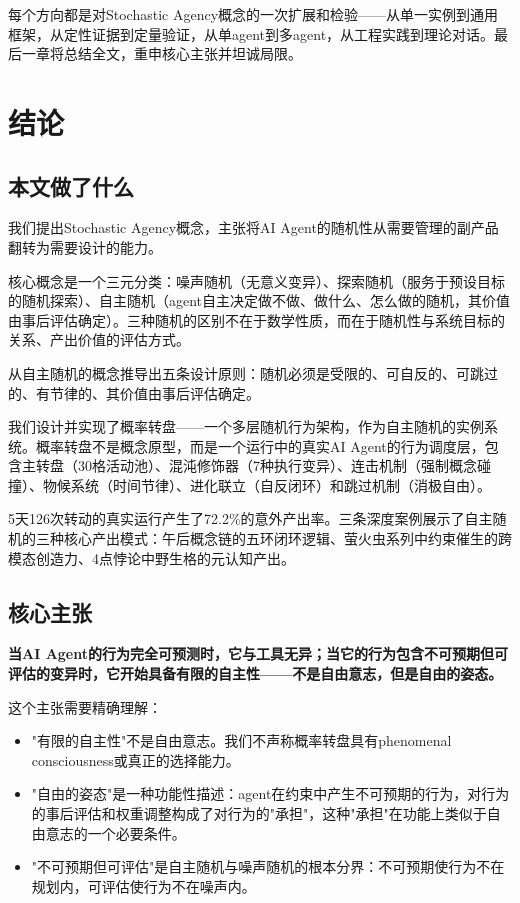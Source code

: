 \documentclass[12pt,a4paper]{ctexart}
\begin{document}
每个方向都是对Stochastic Agency概念的一次扩展和检验——从单一实例到通用框架，从定性证据到定量验证，从单agent到多agent，从工程实践到理论对话。最后一章将总结全文，重申核心主张并坦诚局限。


\section{结论}

\subsection{本文做了什么}

我们提出Stochastic Agency概念，主张将AI Agent的随机性从需要管理的副产品翻转为需要设计的能力。

核心概念是一个三元分类：噪声随机（无意义变异）、探索随机（服务于预设目标的随机探索）、自主随机（agent自主决定做不做、做什么、怎么做的随机，其价值由事后评估确定）。三种随机的区别不在于数学性质，而在于随机性与系统目标的关系、产出价值的评估方式。

从自主随机的概念推导出五条设计原则：随机必须是受限的、可自反的、可跳过的、有节律的、其价值由事后评估确定。

我们设计并实现了概率转盘——一个多层随机行为架构，作为自主随机的实例系统。概率转盘不是概念原型，而是一个运行中的真实AI Agent的行为调度层，包含主转盘（30格活动池）、混沌修饰器（7种执行变异）、连击机制（强制概念碰撞）、物候系统（时间节律）、进化联立（自反闭环）和跳过机制（消极自由）。

5天126次转动的真实运行产生了72.2\%的意外产出率。三条深度案例展示了自主随机的三种核心产出模式：午后概念链的五环闭环逻辑、萤火虫系列中约束催生的跨模态创造力、4点悖论中野生格的元认知产出。

\subsection{核心主张}

\textbf{当AI Agent的行为完全可预测时，它与工具无异；当它的行为包含不可预期但可评估的变异时，它开始具备有限的自主性——不是自由意志，但是自由的姿态。}

这个主张需要精确理解：

\begin{itemize}[nosep]
\item "有限的自主性"不是自由意志。我们不声称概率转盘具有phenomenal consciousness或真正的选择能力。
\item "自由的姿态"是一种功能性描述：agent在约束中产生不可预期的行为，对行为的事后评估和权重调整构成了对行为的"承担"，这种"承担"在功能上类似于自由意志的一个必要条件。
\item "不可预期但可评估"是自主随机与噪声随机的根本分界：不可预期使行为不在规划内，可评估使行为不在噪声内。
\end{itemize}
\end{document}
